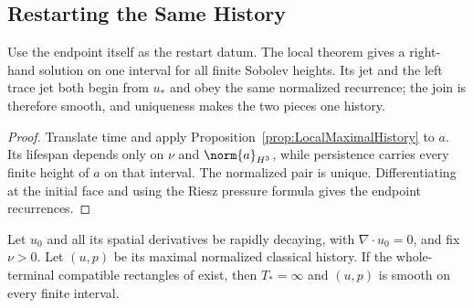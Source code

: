 \subsection{Restarting the Same History}\label{sub:RestartingTheSameHistory}

Use the endpoint itself as the restart datum.  The local theorem gives a
right-hand solution on one interval for all finite Sobolev heights.  Its jet and
the left trace jet both begin from \(u_*\) and obey the same normalized
recurrence; the join is therefore smooth, and uniqueness makes the two pieces
one history.


\begin{proof}
Translate time and apply Proposition~\ref{prop:LocalMaximalHistory} to \(a\).
Its lifespan depends only on \(\nu\) and \(\norm{a}_{H^3}\), while persistence
carries every finite height of \(a\) on that interval.  The normalized pair is
unique.  Differentiating at the initial face and using the Riesz pressure formula
gives the endpoint recurrences.
\end{proof}

\begin{theorem}\label{thm:CompatibleIntersectionClosure}
Let \(u_0\) and all its spatial derivatives be rapidly decaying, with
\(\nabla\cdot u_0=0\), and fix \(\nu>0\).  Let \((u,p)\) be its maximal
normalized classical history.  If the whole-terminal compatible rectangles of
 exist, then \(T_*=\infty\)
and \((u,p)\) is smooth on every finite interval.
\end{theorem}

